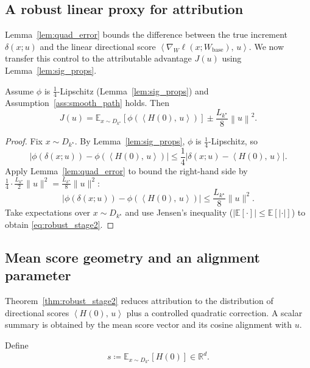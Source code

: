 \documentclass[bdcc,article,submit,pdftex]{Definitions/mdpi}
\newcommand{\R}{\mathbb{R}}
\newcommand{\ip}[2]{\left\langle #1,\,#2 \right\rangle}
\newcommand{\norm}[1]{\left\lVert #1 \right\rVert}
\newcommand{\E}{\mathbb{E}}
\newcommand{\tindex}{k^\star}
\newcommand{\utarget}{u}
\begin{document}
\subsection{A robust linear proxy for attribution}

Lemma~\ref{lem:quad_error} bounds the difference between the true increment $\delta(x;\utarget)$ and the linear directional score
$\ip{\nabla_W \ell(x;W_{\mathrm{base}})}{\utarget}$.
We now transfer this control to the attributable advantage $J(\utarget)$ using Lemma~\ref{lem:sig_props}.

\begin{Theorem}
\label{thm:robust_stage2}
Assume $\phi$ is $\tfrac14$-Lipschitz (Lemma~\ref{lem:sig_props}) and Assumption~\ref{ass:smooth_path} holds.
Then
\begin{equation}
\label{eq:robust_stage2}
J(\utarget)
=
\E_{x\sim D_{\tindex}}\left[\phi\!\left(\ip{H(0)}{\utarget}\right)\right]
\pm \frac{L_{\tindex}}{8}\norm{\utarget}^2.
\end{equation}
\end{Theorem}

\begin{proof}
Fix $x\sim D_{\tindex}$. By Lemma~\ref{lem:sig_props}, $\phi$ is $\tfrac14$-Lipschitz, so
\[
\left|\phi(\delta(x;\utarget))-\phi\!\left(\ip{H(0)}{\utarget}\right)\right|
\le \frac14\left|\delta(x;\utarget)-\ip{H(0)}{\utarget}\right|.
\]
Apply Lemma~\ref{lem:quad_error} to bound the right-hand side by $\frac14\cdot \frac{L_{\tindex}}{2}\|\utarget\|^2=\frac{L_{\tindex}}{8}\|\utarget\|^2$:
\[
\left|\phi(\delta(x;\utarget))-\phi\!\left(\ip{H(0)}{\utarget}\right)\right|
\le \frac{L_{\tindex}}{8}\|\utarget\|^2.
\]
Take expectations over $x\sim D_{\tindex}$ and use Jensen's inequality ($|\E[\cdot]|\le \E[|\cdot|]$) to obtain \eqref{eq:robust_stage2}.
\end{proof}

\subsection{Mean score geometry and an alignment parameter}

Theorem~\ref{thm:robust_stage2} reduces attribution to the distribution of directional scores $\ip{H(0)}{\utarget}$ plus a controlled quadratic correction.
A scalar summary is obtained by the mean score vector and its cosine alignment with $\utarget$.

\begin{Definition}
\label{def:score}
Define
\begin{equation}
\label{eq:s}
s \coloneqq \E_{x\sim D_{\tindex}}[H(0)]\in\R^d.
\end{equation}
\end{Definition}
\end{document}
